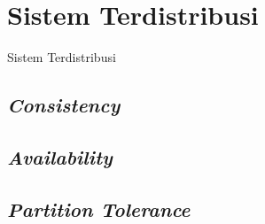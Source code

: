 \section{Sistem Terdistribusi}
\label{sec:sistem-terdistribusi}

Sistem Terdistribusi 

\subsection{\textit{Consistency}}
\subsection{\textit{Availability}}
\subsection{\textit{Partition Tolerance}}

% 
% 
